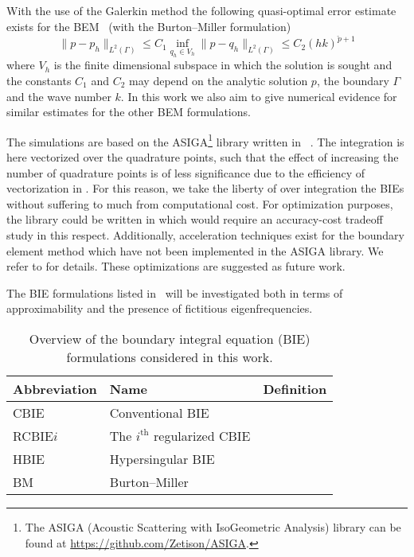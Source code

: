 With the use of the Galerkin method the following quasi-optimal error estimate exists for the BEM~\cite[Theorem 2.49]{Chandler_Wilde2012nab} (with the Burton--Miller formulation)
\begin{equation}\label{Eq3:aprioriErrorEstimate}
	\|p-p_h\|_{L^2(\Gamma)} \leq C_1 \inf_{q_h\in V_h}\|p-q_h\|_{L^2(\Gamma)} \leq C_2 (hk)^{\check{p}+1}
\end{equation}
where $V_h$ is the finite dimensional subspace in which the solution is sought and the constants $C_1$ and $C_2$ may depend on the analytic solution $p$, the boundary $\Gamma$ and the wave number $k$. In this work we also aim to give numerical evidence for similar estimates for the other BEM formulations.

The simulations are based on the ASIGA\footnote{The ASIGA (Acoustic Scattering with IsoGeometric Analysis) library can be found at \href{https://github.com/Zetison/ASIGA}{https://github.com/Zetison/ASIGA}.} library written in \MATLAB~\cite{MatlabR2019a}. The integration is here vectorized over the quadrature points, such that the effect of increasing the number of quadrature points is of less significance due to the efficiency of vectorization in \MATLAB. For this reason, we take the liberty of over integration the BIEs without suffering to much from computational cost. For optimization purposes, the library could be written in \ccpp which would require an accuracy-cost tradeoff study in this respect. Additionally, acceleration techniques exist for the boundary element method which have not been implemented in the ASIGA library. We refer to \cite{Dolz2016aib,Dolz2018afi,Beer2008tbe} for details. These optimizations are suggested as future work.

The BIE formulations listed in~ will be investigated both in terms of approximability and the presence of fictitious eigenfrequencies.
\begin{table}
	\centering
	\caption{Overview of the boundary integral equation (BIE) formulations considered in this work.}
	\label{Tab3:BIEs}
	\begin{tabular}{l l l}
		\toprule
		Abbreviation & Name & Definition\\
		\hline
		CBIE & Conventional BIE & \Cref{Eq3:CBIE}\\
		RCBIE$i$ & The $i^{\mathrm{th}}$ regularized CBIE & \Cref{Eq3:RCBIE1,Eq3:RCBIE2,Eq3:RCBIE3}\\
		HBIE & Hypersingular BIE & \Cref{Eq3:HBIE}\\
		BM & Burton--Miller & \Cref{Eq3:BM}\\
		\bottomrule
	\end{tabular}
\end{table}

